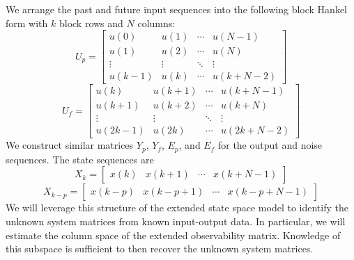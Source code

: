 We arrange the past and future input sequences into the following block Hankel form with $k$ block rows and $N$ columns:
\begin{equation*}
U_p = \begin{bmatrix}
u(0) & u(1) & \cdots & u(N-1)\\
u(1) & u(2) & \cdots & u(N)\\
\vdots & \vdots & \ddots & \vdots\\
u(k-1) & u(k) & \cdots & u(k+N-2)
\end{bmatrix}
\end{equation*}
\begin{equation*}
U_f = \begin{bmatrix}
u(k) & u(k+1) & \cdots & u(k+N-1)\\
u(k+1) & u(k+2) & \cdots & u(k+N)\\
\vdots & \vdots & \ddots & \vdots\\
u(2k-1) & u(2k) & \cdots & u(2k+N-2)
\end{bmatrix}
\end{equation*}
We construct similar matrices $Y_p$, $Y_f$, $E_p$, and $E_f$ for the output and noise sequences. The state sequences are
\begin{equation*}
X_k = \begin{bmatrix}
x(k) & x(k+1) & \cdots & x(k+N-1)
\end{bmatrix}
\end{equation*}
\begin{equation*}
X_{k-p} = \begin{bmatrix}
x(k-p) & x(k-p+1) & \cdots & x(k-p+N-1)
\end{bmatrix}
\end{equation*}
We will leverage this structure of the extended state space model to identify the unknown system matrices from known input-output data. In particular, we will estimate the column space of the extended observability matrix. Knowledge of this subspace is sufficient to then recover the unknown system matrices. 


